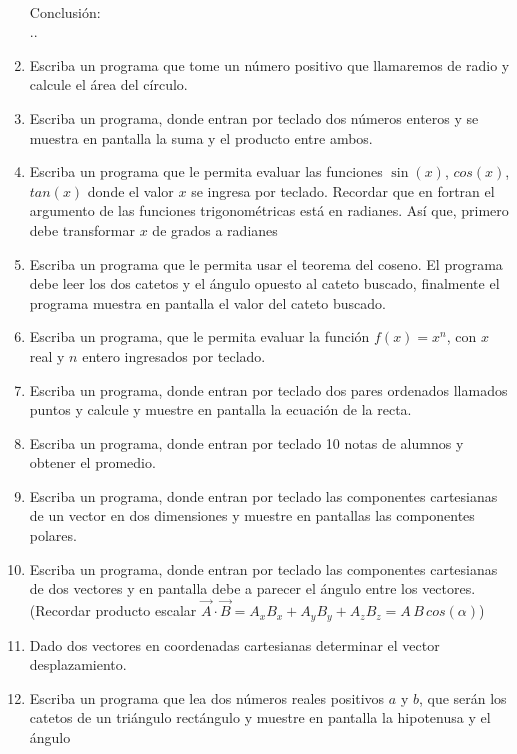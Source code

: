 \documentclass[11pt]{exam}
\begin{document}
\begin{enumerate}
\begin{minipage}{5cm}
\end{minipage}
\\
Conclusi\'on: \dotfill \\
..\dotfill
\item 
Escriba un programa que tome un  n\'umero positivo que llamaremos de radio  y calcule el \'area del c\'irculo.
\item Escriba un programa, donde entran por teclado dos n\'umeros enteros y se muestra en pantalla la suma
 y el producto entre ambos.
\item 
Escriba un programa que le permita evaluar las  funciones $\sin(x)$, $cos(x)$, $tan(x)$ 
donde el valor $x$ se ingresa por teclado. Recordar que en fortran el argumento de las funciones 
trigonom\'etricas est\'a en radianes.  As\'i que, primero debe transformar  $x$ de grados a radianes 
\item 
Escriba un programa que le permita usar el teorema del coseno. El programa debe leer los dos catetos y el
 \'angulo opuesto al cateto buscado, finalmente el programa muestra en pantalla el valor del cateto buscado.
\item Escriba un programa, que le permita evaluar la funci\'on $f(x)= x^n$, con $x$ real y $n$ entero ingresados  por teclado.
\item Escriba un programa, donde entran por teclado dos pares ordenados llamados puntos y calcule y muestre en pantalla
 la ecuaci\'on de la recta.
\item 
Escriba un programa, donde entran por teclado 10 notas de alumnos y obtener  el promedio.
\item Escriba un programa, donde entran por teclado las componentes cartesianas de un vector en 
dos dimensiones y muestre en pantallas las componentes polares.
\item 
Escriba un programa, donde entran por teclado las componentes cartesianas de dos vectores y
en pantalla debe a parecer el \'angulo entre los vectores. (Recordar producto escalar 
$\vec A \cdot \vec B=A_x B_x+A_y B_y+A_z B_z= A\, B\, cos(\alpha)$)
\item 
Dado dos vectores en coordenadas cartesianas determinar el vector desplazamiento.
\item 
Escriba un programa que lea dos n\'umeros reales positivos $a$ y $b$,  que ser\'an los catetos de un
tri\'angulo rect\'angulo y muestre en pantalla la hipotenusa y el \'angulo
\end{enumerate}
%
\end{document}
